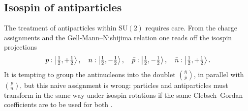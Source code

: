 \subsection{Isospin of antiparticles}
\label{subsec:antiparticles}

The treatment of antiparticles within $\mathrm{SU}(2)$ requires care. From the
charge assignments and the Gell-Mann--Nishijima relation one reads off the isospin
projections
\begin{equation}
    p : \ket{\tfrac{1}{2}, +\tfrac{1}{2}}, \quad
    n : \ket{\tfrac{1}{2}, -\tfrac{1}{2}}, \quad
    \bar{p} : \ket{\tfrac{1}{2}, -\tfrac{1}{2}}, \quad
    \bar{n} : \ket{\tfrac{1}{2}, +\tfrac{1}{2}} .
\end{equation}
It is tempting to group the antinucleons into the doublet $\binom{\bar{n}}{\bar{p}}$,
in parallel with $\binom{p}{n}$, but this naive assignment is wrong: particles and
antiparticles must transform in the same way under isospin rotations if the same
Clebsch--Gordan coefficients are to be used for both \cite[Ch.~6]{Amsler2018}.

